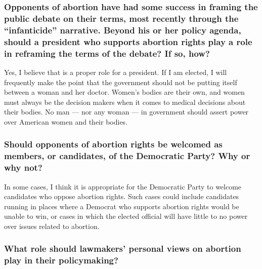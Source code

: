 \hypertarget{opponents-of-abortion-have-had-some-success-in-framing-the-public-debate-on-their-terms-most-recently-through-the-infanticide-narrative-beyond-his-or-her-policy-agenda-should-a-president-who-supports-abortion-rights-play-a-role-in-reframing-the-terms-of-the-debate-if-so-how-5}{%
\subsubsection{Opponents of abortion have had some success in framing
the public debate on their terms, most recently through the
``infanticide'' narrative. Beyond his or her policy agenda, should a
president who supports abortion rights play a role in reframing the
terms of the debate? If so,
how?}\label{opponents-of-abortion-have-had-some-success-in-framing-the-public-debate-on-their-terms-most-recently-through-the-infanticide-narrative-beyond-his-or-her-policy-agenda-should-a-president-who-supports-abortion-rights-play-a-role-in-reframing-the-terms-of-the-debate-if-so-how-5}}

Yes, I believe that is a proper role for a president. If I am elected, I
will frequently make the point that the government should not be putting
itself between a woman and her doctor. Women's bodies are their own, and
women must always be the decision makers when it comes to medical
decisions about their bodies. No man --- nor any woman --- in government
should assert power over American women and their bodies.

\hypertarget{should-opponents-of-abortion-rights-be-welcomed-as-members-or-candidates-of-the-democratic-party-why-or-why-not-5}{%
\subsubsection{Should opponents of abortion rights be welcomed as
members, or candidates, of the Democratic Party? Why or why
not?}\label{should-opponents-of-abortion-rights-be-welcomed-as-members-or-candidates-of-the-democratic-party-why-or-why-not-5}}

In some cases, I think it is appropriate for the Democratic Party to
welcome candidates who oppose abortion rights. Such cases could include
candidates running in places where a Democrat who supports abortion
rights would be unable to win, or cases in which the elected official
will have little to no power over issues related to abortion.

\hypertarget{what-role-should-lawmakers-personal-views-on-abortion-play-in-their-policymaking-5}{%
\subsubsection{What role should lawmakers' personal views on abortion
play in their
policymaking?}\label{what-role-should-lawmakers-personal-views-on-abortion-play-in-their-policymaking-5}}

